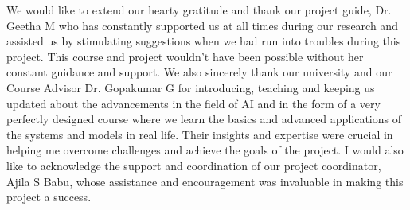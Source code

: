 

\begin{acknowledgements}      %
	We would like to extend our hearty gratitude and thank our project guide, Dr. Geetha M who has constantly supported us at all times during our research and assisted us by stimulating suggestions when we had run into troubles during this project. This course and project wouldn’t have been possible without her constant guidance and support. We also sincerely thank our university and our Course Advisor Dr. Gopakumar G for introducing, teaching and keeping us updated about the advancements in the field of AI and in the form of a very perfectly designed course where we learn the basics and advanced applications of the systems and models in real life. Their insights and expertise were crucial in helping me overcome challenges and achieve the goals of the project. I would also like to acknowledge the support and coordination of our project coordinator, Ajila S Babu, whose assistance and encouragement was invaluable in making this project a success.

\end{acknowledgements}













